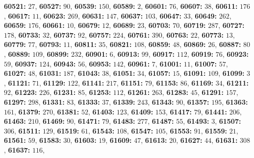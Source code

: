 \textsf{\bfseries 60521:} $27$, \textsf{\bfseries 60527:} $90$, \textsf{\bfseries 60539:} $150$, \textsf{\bfseries 60589:} $2$, \textsf{\bfseries 60601:} $76$, \textsf{\bfseries 60607:} $38$, \textsf{\bfseries 60611:} $176$, \textsf{\bfseries 60617:} $11$, \textsf{\bfseries 60623:} $269$, \textsf{\bfseries 60631:} $147$, \textsf{\bfseries 60637:} $103$, \textsf{\bfseries 60647:} $33$, \textsf{\bfseries 60649:} $262$, \textsf{\bfseries 60659:} $176$, \textsf{\bfseries 60661:} $10$, \textsf{\bfseries 60679:} $12$, \textsf{\bfseries 60689:} $23$, \textsf{\bfseries 60703:} $70$, \textsf{\bfseries 60719:} $287$, \textsf{\bfseries 60727:} $178$, \textsf{\bfseries 60733:} $32$, \textsf{\bfseries 60737:} $92$, \textsf{\bfseries 60757:} $224$, \textsf{\bfseries 60761:} $390$, \textsf{\bfseries 60763:} $22$, \textsf{\bfseries 60773:} $13$, \textsf{\bfseries 60779:} $77$, \textsf{\bfseries 60793:} $11$, \textsf{\bfseries 60811:} $35$, \textsf{\bfseries 60821:} $108$, \textsf{\bfseries 60859:} $48$, \textsf{\bfseries 60869:} $26$, \textsf{\bfseries 60887:} $80$, \textsf{\bfseries 60889:} $109$, \textsf{\bfseries 60899:} $232$, \textsf{\bfseries 60901:} $6$, \textsf{\bfseries 60913:} $99$, \textsf{\bfseries 60917:} $112$, \textsf{\bfseries 60919:} $76$, \textsf{\bfseries 60923:} $59$, \textsf{\bfseries 60937:} $124$, \textsf{\bfseries 60943:} $56$, \textsf{\bfseries 60953:} $142$, \textsf{\bfseries 60961:} $7$, \textsf{\bfseries 61001:} $11$, \textsf{\bfseries 61007:} $57$, \textsf{\bfseries 61027:} $48$, \textsf{\bfseries 61031:} $187$, \textsf{\bfseries 61043:} $38$, \textsf{\bfseries 61051:} $34$, \textsf{\bfseries 61057:} $15$, \textsf{\bfseries 61091:} $109$, \textsf{\bfseries 61099:} $3$, \textsf{\bfseries 61121:} $71$, \textsf{\bfseries 61129:} $122$, \textsf{\bfseries 61141:} $217$, \textsf{\bfseries 61151:} $79$, \textsf{\bfseries 61153:} $86$, \textsf{\bfseries 61169:} $34$, \textsf{\bfseries 61211:} $92$, \textsf{\bfseries 61223:} $226$, \textsf{\bfseries 61231:} $85$, \textsf{\bfseries 61253:} $112$, \textsf{\bfseries 61261:} $263$, \textsf{\bfseries 61283:} $45$, \textsf{\bfseries 61291:} $157$, \textsf{\bfseries 61297:} $298$, \textsf{\bfseries 61331:} $83$, \textsf{\bfseries 61333:} $37$, \textsf{\bfseries 61339:} $243$, \textsf{\bfseries 61343:} $90$, \textsf{\bfseries 61357:} $195$, \textsf{\bfseries 61363:} $161$, \textsf{\bfseries 61379:} $270$, \textsf{\bfseries 61381:} $52$, \textsf{\bfseries 61403:} $123$, \textsf{\bfseries 61409:} $153$, \textsf{\bfseries 61417:} $79$, \textsf{\bfseries 61441:} $206$, \textsf{\bfseries 61463:} $210$, \textsf{\bfseries 61469:} $90$, \textsf{\bfseries 61471:} $79$, \textsf{\bfseries 61483:} $277$, \textsf{\bfseries 61487:} $55$, \textsf{\bfseries 61493:} $3$, \textsf{\bfseries 61507:} $306$, \textsf{\bfseries 61511:} $129$, \textsf{\bfseries 61519:} $61$, \textsf{\bfseries 61543:} $108$, \textsf{\bfseries 61547:} $105$, \textsf{\bfseries 61553:} $91$, \textsf{\bfseries 61559:} $21$, \textsf{\bfseries 61561:} $59$, \textsf{\bfseries 61583:} $30$, \textsf{\bfseries 61603:} $19$, \textsf{\bfseries 61609:} $47$, \textsf{\bfseries 61613:} $20$, \textsf{\bfseries 61627:} $44$, \textsf{\bfseries 61631:} $308$, \textsf{\bfseries 61637:} $116$, 
